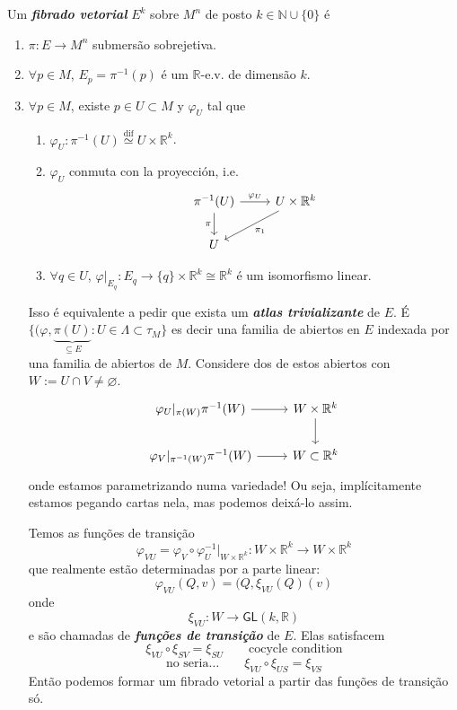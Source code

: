 \begin{defn}\leavevmode
Um \textit{\textbf{fibrado vetorial }} \(E^k\) sobre \(M^n\) de posto \(k \in \mathbb{N} \cup  \{0\}\) é
\begin{enumerate}
\item \(\pi:E \to M^n\) submersão sobrejetiva.
\item \(\forall  p \in M\), \(E_p = \pi^{-1}(p)\) é um \(\mathbb{R}\)-e.v. de dimensão \(k\).
\item \(\forall p \in M\), existe \(p \in U \subset M\) y \(\varphi_U\) tal que
	\begin{enumerate}
\item  \(\varphi_U: \pi^{-1}(U) \overset{\operatorname{dif}}{\simeq}U \times \mathbb{R}^k\).
\item \(\varphi_U\) conmuta con la proyección, i.e.
	\[\begin{tikzcd}
	\pi^{-1}(U)\arrow[r,"\varphi_U"]\arrow[d,"\pi",swap]&U \times \mathbb{R}^k\arrow[dl,"\pi_1"]\\
	U
	\end{tikzcd}\]
	\item \(\forall  q \in U\), \(\varphi|_{E_q}:E_q \to \{q\} \times \mathbb{R}^k\cong\mathbb{R}^k\) é um isomorfismo linear.
		\end{enumerate}

	Isso é equivalente a pedir que exista um \textit{\textbf{atlas trivializante}} de \(E\). É \(\{(\varphi,\underbrace{\pi(U)}_{\subseteq E}:U \in \Lambda \subset \tau_M\}\) es decir una familia de abiertos en \(E\) indexada por una familia de abiertos de \(M\). Considere dos de estos abiertos con \(W:=U \cap V \neq  \varnothing\).
	\[\begin{tikzcd}
		\varphi_U|_{\pi(W)}\pi^{-1}(W)\arrow[r]& W \times \mathbb{R}^k\arrow[d]\\
		\varphi_V|_{\pi^{-1}(W)}\pi^{-1}(W)\arrow[r]&W \subset \mathbb{R}^k
	\end{tikzcd}\]
onde estamos parametrizando numa variedade! Ou seja, implícitamente estamos pegando cartas nela, mas podemos deixá-lo assim.

Temos as funções de transição
\[\varphi_{VU}=\varphi_V \circ \varphi_U^{-1}|_{W\times\mathbb{R}^k}:W\times\mathbb{R}^k \to W \times \mathbb{R}^k\]
que realmente estão determinadas por a parte linear:
\[\varphi_{VU}(Q,v)=(Q,\xi_{VU}(Q)(v)\]
onde
\[\xi_{VU}:W \to \mathsf{GL}(k,\mathbb{R})\]
e são chamadas de \textit{\textbf{funções de transição}} de \(E\). Elas satisfacem
\[\xi_{VU}\circ\xi_{SV}=\xi_{SU}\qquad \text{cocycle condition} \]
\[\text{no seria…} \qquad \xi_{VU}\circ\xi_{US}=\xi_{VS}\]
Então podemos formar um fibrado vetorial a partir das funções de transição só.
\end{enumerate}
\end{defn}

